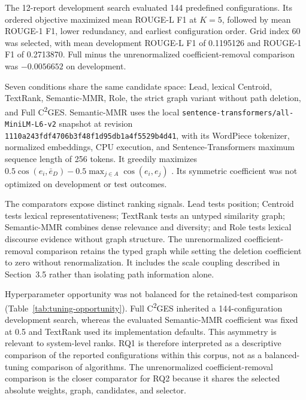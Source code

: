 \documentclass[applsci,article,submit,moreauthors]{Definitions/mdpi}
\newcommand{\cges}{C\textsuperscript{2}GES}
\begin{document}
The 12-report development search evaluated 144 predefined configurations. Its ordered objective maximized mean ROUGE-L F1 at $K=5$, followed by mean ROUGE-1 F1, lower redundancy, and earliest configuration order. Grid index 60 was selected, with mean development ROUGE-L F1 of 0.1195126 and ROUGE-1 F1 of 0.2713870. Full minus the unrenormalized coefficient-removal comparison was $-0.0056652$ on development.

Seven conditions share the same candidate space: Lead, lexical Centroid, TextRank, Semantic-MMR, Role, the strict graph variant without path deletion, and Full \cges{}. Semantic-MMR uses the local \texttt{sentence-transformers/all-MiniLM-L6-v2} snapshot at revision \texttt{1110a243fdf4706b3f48f1d95db1a4f5529b4d41}, with its WordPiece tokenizer, normalized embeddings, CPU execution, and Sentence-Transformers maximum sequence length of 256 tokens. It greedily maximizes $0.5\cos(e_i,\bar e_D)-0.5\max_{j\in A}\cos(e_i,e_j)$ \cite{reimers2019sentencebert}. Its symmetric coefficient was not optimized on development or test outcomes.

The comparators expose distinct ranking signals. Lead tests position; Centroid tests lexical representativeness; TextRank tests an untyped similarity graph; Semantic-MMR combines dense relevance and diversity; and Role tests lexical discourse evidence without graph structure. The unrenormalized coefficient-removal comparison retains the typed graph while setting the deletion coefficient to zero without renormalization. It includes the scale coupling described in Section~3.5 rather than isolating path information alone.

Hyperparameter opportunity was not balanced for the retained-test comparison (Table~\ref{tab:tuning-opportunity}). Full \cges{} inherited a 144-configuration development search, whereas the evaluated Semantic-MMR coefficient was fixed at 0.5 and TextRank used its implementation defaults. This asymmetry is relevant to system-level ranks. RQ1 is therefore interpreted as a descriptive comparison of the reported configurations within this corpus, not as a balanced-tuning comparison of algorithms. The unrenormalized coefficient-removal comparison is the closer comparator for RQ2 because it shares the selected absolute weights, graph, candidates, and selector.
\end{document}
